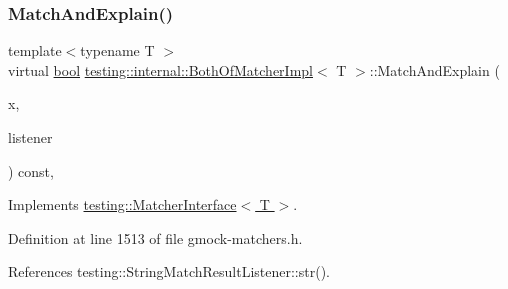 \subsubsection{\texorpdfstring{Match\+And\+Explain()}{MatchAndExplain()}}
{\footnotesize\ttfamily template$<$typename T $>$ \\
virtual \hyperlink{classbool}{bool} \hyperlink{classtesting_1_1internal_1_1BothOfMatcherImpl}{testing\+::internal\+::\+Both\+Of\+Matcher\+Impl}$<$ T $>$\+::Match\+And\+Explain (\begin{DoxyParamCaption}\item[{T}]{x,  }\item[{\hyperlink{classtesting_1_1MatchResultListener}{Match\+Result\+Listener} $\ast$}]{listener }\end{DoxyParamCaption}) const\hspace{0.3cm}{\ttfamily [inline]}, {\ttfamily [virtual]}}



Implements \hyperlink{classtesting_1_1MatcherInterface_a296b43607cd99d60365f0e6a762777cf}{testing\+::\+Matcher\+Interface$<$ T $>$}.



Definition at line 1513 of file gmock-\/matchers.\+h.



References testing\+::\+String\+Match\+Result\+Listener\+::str().


